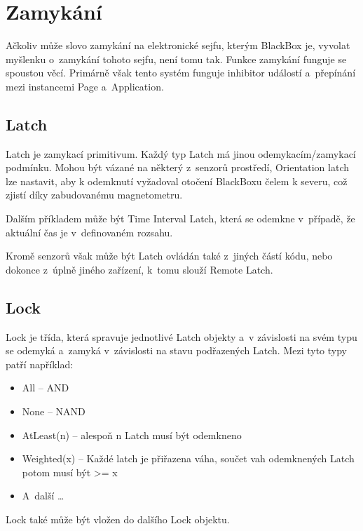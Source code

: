 \section{Zamykání}

Ačkoliv může slovo zamykání na elektronické sejfu, kterým BlackBox je, vyvolat myšlenku o~zamykání tohoto sejfu, není tomu tak.
Funkce zamykání funguje se spoustou věcí.
Primárně však tento systém funguje inhibitor událostí a~přepínání mezi instancemi Page a~Application.

\subsection{Latch}
Latch je zamykací primitivum.
Každý typ Latch má jinou odemykacím/zamykací podmínku.
Mohou být vázané na některý z~senzorů prostředí, Orientation latch lze nastavit, aby k odemknutí vyžadoval otočení BlackBoxu čelem k severu, což zjistí díky zabudovanému magnetometru.

Dalším příkladem může být Time Interval Latch, která se odemkne v~případě, že aktuální čas je v~definovaném rozsahu.

Kromě senzorů však může být Latch ovládán také z~jiných částí kódu, nebo dokonce z~úplně jiného zařízení, k~tomu slouží Remote Latch.

\subsection{Lock}

Lock je třída, která spravuje jednotlivé Latch objekty a~v závislosti na svém typu se odemyká a~zamyká v~závislosti na stavu podřazených Latch.
Mezi tyto typy patří například:
\begin{itemize}
    \item All -- AND
    \item None -- NAND
    \item AtLeast(n) -- alespoň n Latch musí být odemkneno
    \item Weighted(x) -- Každé latch je přiřazena váha, součet vah odemknených Latch potom musí být >= x
    \item A~další \dots
\end{itemize}
Lock také může být vložen do dalšího Lock objektu.

